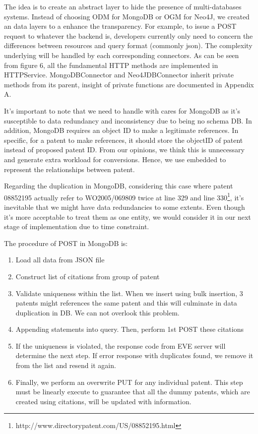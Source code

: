 \documentclass{sig-alternate}
\begin{document}
{The idea is to create an abstract layer to hide the presence of multi-databases systems. Instead of choosing ODM for MongoDB or OGM for Neo4J, we created an data layers to a enhance the transparency. For example, to issue a POST request to whatever the backend is, developers currently only need to concern the differences between resources and query format (commonly json). The complexity underlying will be handled by each corresponding connectors. As can be seen from figure 6, all the fundamental HTTP methods are implemented in HTTPService. MongoDBConnector and Neo4JDBConnector inherit private methods from its parent, insight of private functions are documented in Appendix A. 

It's important to note that we need to handle with cares for MongoDB as it's susceptible to data redundancy and inconsistency due to being no schema DB. In addition, MongoDB requires an object ID to make a legitimate references. In specific, for a patent to make references, it should store the objectID of patent instead of proposed patent ID. From our opinions, we think this is unnecessary and generate extra workload for conversions. Hence, we use embedded to represent the relationships between patent. 

Regarding the duplication in MongoDB, considering this case where patent 08852195 actually refer to WO2005/069809 twice at line 329 and line 330\footnote{http://www.directorypatent.com/US/08852195.html}, it's inevitable that we might have data redundancies to some extents. Even though it's more acceptable to treat them as one entity, we would consider it in our next stage of implementation due to time constraint.

The procedure of POST in MongoDB is:
\begin{enumerate}
 \item Load all data from JSON file
 \item Construct list of citations from group of patent
 \item Validate uniqueness within the list. When we insert using bulk insertion, 3 patents might references the same patent and this will culminate in data duplication in DB. We can not overlook this problem.
 \item Appending statements into query. Then, perform 1st POST these citations 
 \item If the uniqueness is violated, the response code from EVE server will determine the next step. If error response with duplicates found, we remove it from the list and resend it again.
 \item Finally, we perform an overwrite PUT for any individual patent. This step must be linearly execute to guarantee that all the dummy patents, which are created using citations, will be updated with information.
\end{enumerate}

}
\end{document}
